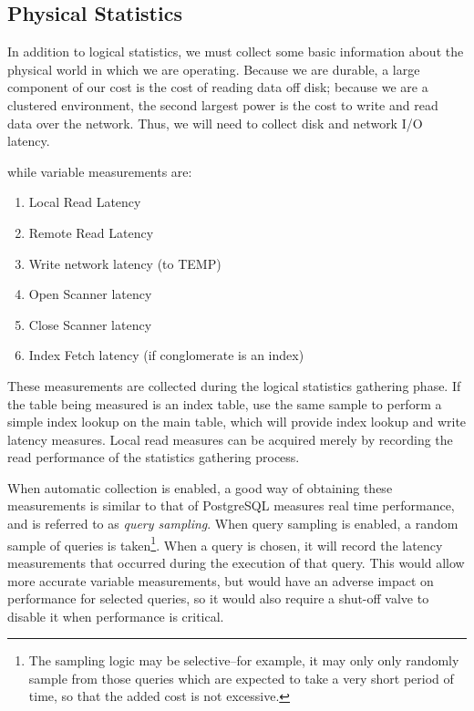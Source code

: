 \subsection{Physical Statistics}
In addition to logical statistics, we must collect some basic information about the physical world in which we are operating. Because we are durable, a large component of our cost is the cost of reading data off disk; because we are a clustered environment, the second largest power is the cost to write and read data over the network. Thus, we will need to collect disk and network I/O latency. 

while variable measurements are:
\begin{enumerate}
				\item Local Read Latency
				\item Remote Read Latency
				\item Write network latency (to TEMP)
				\item Open Scanner latency
				\item Close Scanner latency
				\item Index Fetch latency (if conglomerate is an index)
\end{enumerate}

These measurements are collected during the logical statistics gathering phase. If the table being measured is an index table, use the same sample to perform a simple index lookup on the main table, which will provide index lookup and write latency measures. Local read measures can be acquired merely by recording the read performance of the statistics gathering process.

When automatic collection is enabled, a good way of obtaining these measurements is similar to that of PostgreSQL\cite{PGCollector} measures real time performance, and is referred to as \emph{query sampling}. When query sampling is enabled, a random sample of queries is taken\footnote{The sampling logic may be selective--for example, it may only only randomly sample from those queries which are expected to take a very short period of time, so that the added cost is not excessive.}. When a query is chosen, it will record the latency measurements that occurred during the execution of that query. This would allow more accurate variable measurements, but would have an adverse impact on performance for selected queries, so it would also require a shut-off valve to disable it when performance is critical.

